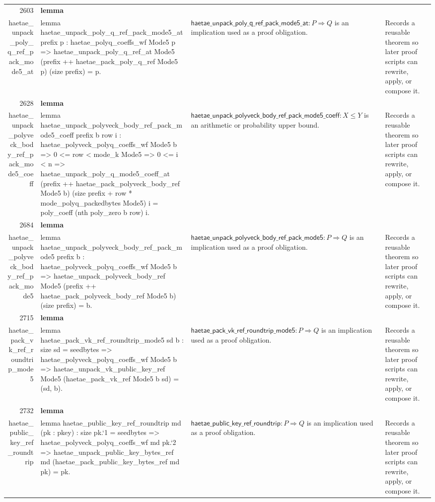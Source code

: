 \documentclass[10pt]{article}
\newcommand{\ec}[1]{\begingroup\ttfamily\scriptsize #1\endgroup}
\begin{document}
\begin{longtable}{r L{0.17\textwidth} L{0.26\textwidth} L{0.27\textwidth} L{0.20\textwidth}}
2603 & \textbf{lemma}\\\ec{haetae\_unpack\_poly\_q\_ref\_pack\_mode5\_at} & \ec{lemma haetae\_unpack\_poly\_q\_ref\_pack\_mode5\_at prefix p : haetae\_polyq\_coeffs\_wf Mode5 p => haetae\_unpack\_poly\_q\_ref\_at Mode5 (prefix ++ haetae\_pack\_poly\_q\_ref Mode5 p) (size prefix) = p.} & \(\mathsf{haetae\_unpack\_poly\_q\_ref\_pack\_mode5\_at} : P \Rightarrow Q\) is an implication used as a proof obligation. & Records a reusable theorem so later proof scripts can rewrite, apply, or compose it. \\
2628 & \textbf{lemma}\\\ec{haetae\_unpack\_polyveck\_body\_ref\_pack\_mode5\_coeff} & \ec{lemma haetae\_unpack\_polyveck\_body\_ref\_pack\_mode5\_coeff prefix b row i : haetae\_polyveck\_polyq\_coeffs\_wf Mode5 b => 0 <= row < mode\_k Mode5 => 0 <= i < n => haetae\_unpack\_poly\_q\_mode5\_coeff\_at (prefix ++ haetae\_pack\_polyveck\_body\_ref Mode5 b) (size prefix + row * mode\_polyq\_packedbytes Mode5) i = poly\_coeff (nth poly\_zero b row) i.} & \(\mathsf{haetae\_unpack\_polyveck\_body\_ref\_pack\_mode5\_coeff} : X \le Y\) is an arithmetic or probability upper bound. & Records a reusable theorem so later proof scripts can rewrite, apply, or compose it. \\
2684 & \textbf{lemma}\\\ec{haetae\_unpack\_polyveck\_body\_ref\_pack\_mode5} & \ec{lemma haetae\_unpack\_polyveck\_body\_ref\_pack\_mode5 prefix b : haetae\_polyveck\_polyq\_coeffs\_wf Mode5 b => haetae\_unpack\_polyveck\_body\_ref Mode5 (prefix ++ haetae\_pack\_polyveck\_body\_ref Mode5 b) (size prefix) = b.} & \(\mathsf{haetae\_unpack\_polyveck\_body\_ref\_pack\_mode5} : P \Rightarrow Q\) is an implication used as a proof obligation. & Records a reusable theorem so later proof scripts can rewrite, apply, or compose it. \\
2715 & \textbf{lemma}\\\ec{haetae\_pack\_vk\_ref\_roundtrip\_mode5} & \ec{lemma haetae\_pack\_vk\_ref\_roundtrip\_mode5 sd b : size sd = seedbytes => haetae\_polyveck\_polyq\_coeffs\_wf Mode5 b => haetae\_unpack\_vk\_public\_key\_ref Mode5 (haetae\_pack\_vk\_ref Mode5 b sd) = (sd, b).} & \(\mathsf{haetae\_pack\_vk\_ref\_roundtrip\_mode5} : P \Rightarrow Q\) is an implication used as a proof obligation. & Records a reusable theorem so later proof scripts can rewrite, apply, or compose it. \\
2732 & \textbf{lemma}\\\ec{haetae\_public\_key\_ref\_roundtrip} & \ec{lemma haetae\_public\_key\_ref\_roundtrip md (pk : pkey) : size pk.`1 = seedbytes => haetae\_polyveck\_polyq\_coeffs\_wf md pk.`2 => haetae\_unpack\_public\_key\_bytes\_ref md (haetae\_pack\_public\_key\_bytes\_ref md pk) = pk.} & \(\mathsf{haetae\_public\_key\_ref\_roundtrip} : P \Rightarrow Q\) is an implication used as a proof obligation. & Records a reusable theorem so later proof scripts can rewrite, apply, or compose it. \\

\end{longtable}
\end{document}
